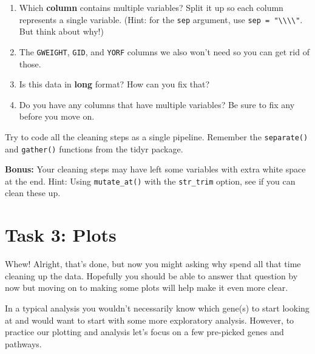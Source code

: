 \documentclass[
]{book}
\providecommand{\tightlist}{%
  \setlength{\itemsep}{0pt}\setlength{\parskip}{0pt}}
\begin{document}
\begin{enumerate}
\def\labelenumi{\arabic{enumi}.}
\tightlist
\item
  Which \textbf{column} contains multiple variables? Split it up so each column represents a single variable. (Hint: for the \texttt{sep} argument, use \texttt{sep\ =\ "\textbackslash{}\textbackslash{}\textbar{}\textbackslash{}\textbackslash{}\textbar{}"}. But think about why!)
\item
  The \texttt{GWEIGHT}, \texttt{GID}, and \texttt{YORF} columns we also won't need so you can get rid of those.
\item
  Is this data in \textbf{long} format? How can you fix that?
\item
  Do you have any columns that have multiple variables? Be sure to fix any before you move on.
\end{enumerate}

Try to code all the cleaning steps as a single pipeline. Remember the \texttt{separate()} and \texttt{gather()} functions from the tidyr package.

\textbf{Bonus:} Your cleaning steps may have left some variables with extra white space at the end. Hint: Using \texttt{mutate\_at()} with the \texttt{str\_trim} option, see if you can clean these up.

\hypertarget{task-3-plots}{%
\section*{Task 3: Plots}\label{task-3-plots}}

Whew! Alright, that's done, but now you might asking why spend all that time cleaning up the data. Hopefully you should be able to answer that question by now but moving on to making some plots will help make it even more clear.

In a typical analysis you wouldn't necessarily know which gene(s) to start looking at and would want to start with some more exploratory analysis. However, to practice our plotting and analysis let's focus on a few pre-picked genes and pathways.
\end{document}
